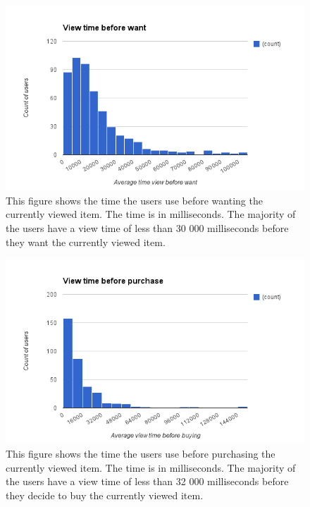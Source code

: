
    \begin{figure}[H]
        \includegraphics[width=5in]{image/viewBeforeWant.png}
        \centering
        \caption[View time before wanting an item]{This figure shows the time the users use before wanting the currently viewed item.
        The time is in milliseconds.
        The majority of the users have a view time of less than 30 000 milliseconds before they want the currently viewed item.}
        \label{figure:viewWant}
    \end{figure}

    \begin{figure}[H]
        \includegraphics[width=5in]{image/viewBeforePurchase.png}
        \centering
        \caption[View time before purchasing an item]{This figure shows the time the users use before purchasing the currently viewed item.
        The time is in milliseconds.
        The majority of the users have a view time of less than 32 000 milliseconds before they decide to buy the currently viewed item.}
        \label{figure:viewBuy}
    \end{figure}

